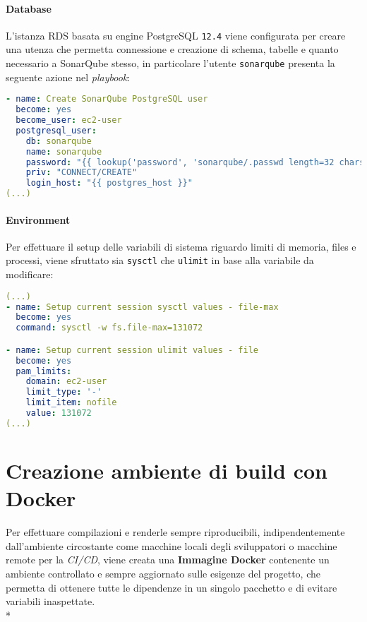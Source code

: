 \documentclass[../main.tex]{subfiles}
\begin{document}
    	    \paragraph{Database}
    	    L'istanza RDS basata su engine PostgreSQL \verb|12.4| viene configurata per creare una utenza che permetta connessione e creazione di schema, tabelle e quanto necessario a SonarQube stesso, in particolare l'utente \verb|sonarqube| presenta la seguente azione nel \emph{playbook}:
    	    \begin{lstlisting}[language=yaml]
- name: Create SonarQube PostgreSQL user
  become: yes
  become_user: ec2-user
  postgresql_user:
    db: sonarqube
    name: sonarqube
    password: "{{ lookup('password', 'sonarqube/.passwd length=32 chars=ascii_letters,digits,hexdigits') }}"
    priv: "CONNECT/CREATE"
    login_host: "{{ postgres_host }}"
(...)
    	    \end{lstlisting}
    	
    	    \paragraph{Environment}
    	    Per effettuare il setup delle variabili di sistema riguardo limiti di memoria, files e processi, viene sfruttato sia \verb|sysctl| che \verb|ulimit| in base alla variabile da modificare:
    	    \begin{lstlisting}[language=yaml]
(...)
- name: Setup current session sysctl values - file-max
  become: yes
  command: sysctl -w fs.file-max=131072

- name: Setup current session ulimit values - file
  become: yes
  pam_limits:
    domain: ec2-user
    limit_type: '-'
    limit_item: nofile
    value: 131072
(...)
    	    \end{lstlisting}

    	\section{Creazione ambiente di build con Docker}
    	\label{sec:cloud_arch_docker}
    	
    	    Per effettuare compilazioni e renderle sempre riproducibili, indipendentemente dall'ambiente circostante come macchine locali degli sviluppatori o macchine remote per la \emph{CI/CD}, viene creata una \textbf{Immagine Docker} contenente un ambiente controllato e sempre aggiornato sulle esigenze del progetto, che permetta di ottenere tutte le dipendenze in un singolo pacchetto e di evitare variabili inaspettate.\\*
    	    
\end{document}
